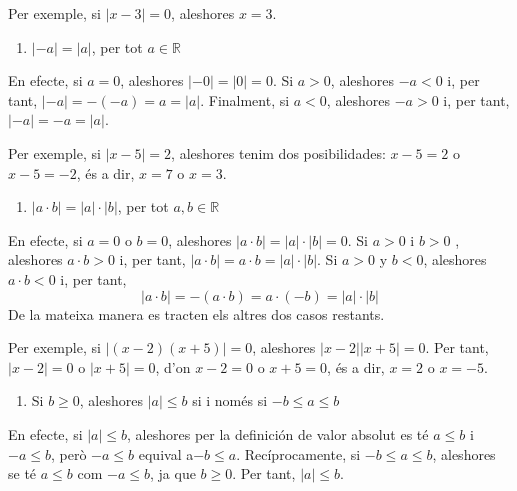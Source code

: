 Per exemple, si $\left\vert x-3\right\vert =0$, aleshores $x=3$.

\begin{enumerate}
\item[2.] $\left\vert -a\right\vert =\left\vert a\right\vert $, per tot $%
a\in \mathbb{R}$
\end{enumerate}

En efecte, si $a=0$, aleshores $\left\vert -0\right\vert =\left\vert
0\right\vert =0$. Si $a>0$, aleshores $-a<0$ i, per tant, $\left\vert
-a\right\vert =-(-a)=a=\left\vert a\right\vert $. Finalment, si $a<0$,
aleshores $-a>0$ i, per tant, $\left\vert -a\right\vert =-a=\left\vert
a\right\vert $.

Per exemple, si $\left\vert x-5\right\vert =2$, aleshores tenim dos
posibilidades: $x-5=2$ o $x-5=-2$, és a dir, $x=7$ o $x=3$.

\begin{enumerate}
\item[3.] $\left\vert a\cdot b\right\vert =\left\vert a\right\vert \cdot
\left\vert b\right\vert $, per tot $a,b\in \mathbb{R}$
\end{enumerate}

En efecte, si $a=0$ o $b=0$, aleshores $\left\vert a\cdot b\right\vert
=\left\vert a\right\vert \cdot \left\vert b\right\vert =0$. Si $a>0$ i $b>0$%
, aleshores $a\cdot b>0$ i, per tant, $\left\vert a\cdot b\right\vert
=a\cdot b=\left\vert a\right\vert \cdot \left\vert b\right\vert $. Si $a>0$
y $b<0$, aleshores $a\cdot b<0$ i, per tant,%
\begin{equation*}
\left\vert a\cdot b\right\vert =-(a\cdot b)=a\cdot (-b)=\left\vert
a\right\vert \cdot \left\vert b\right\vert
\end{equation*}%
De la mateixa manera es tracten els altres dos casos restants.

Per exemple, si $\left\vert (x-2)(x+5)\right\vert =0$, aleshores $\left\vert
x-2\right\vert \left\vert x+5\right\vert =0$. Per tant, $\left\vert
x-2\right\vert =0$ o $\left\vert x+5\right\vert =0$, d’on $x-2=0$ o $%
x+5=0$, és a dir, \thinspace $x=2$ o $x=-5$.

\begin{enumerate}
\item[4.] Si $b\geq 0$, aleshores $\left\vert a\right\vert \leq b$ si i només si $-b\leq a\leq b$
\end{enumerate}

En efecte, si $\left\vert a\right\vert \leq b$, aleshores per la definición de valor absolut es té $a\leq b$ i $-a\leq b$, però $-a\leq b$
equival a$ -b\leq a$. Recíprocamente, si $-b\leq a\leq b$, aleshores se
té $a\leq b$ com $-a\leq b$, ja que $b\geq 0$. Per tant, $\left\vert
a\right\vert \leq b$.

